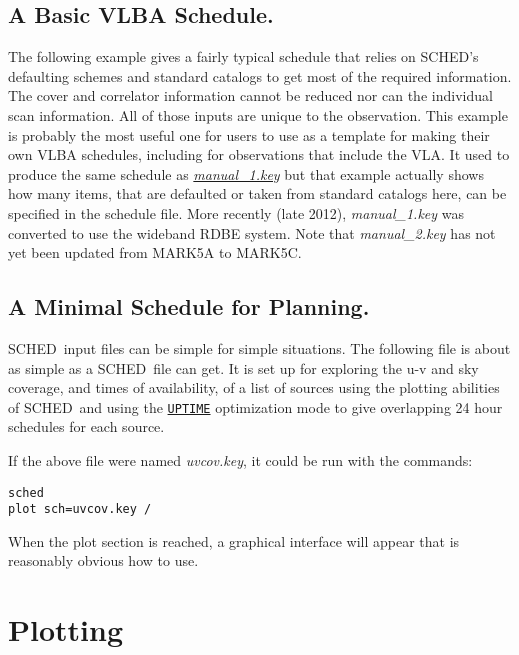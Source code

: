 \documentclass{report}
\newcommand{\sched}{{\sc SCHED}}
\newcommand{\schedb}{{\sc SCHED~}}
\begin{document}
\subsection{\label{SSEC:EXAMPLE1}A Basic VLBA Schedule.}

The following example gives a fairly typical schedule that relies on
\sched's defaulting schemes and standard catalogs to get most of the
required information.  The cover and correlator information cannot be
reduced nor can the individual scan information.  All of those inputs
are unique to the observation.  This example is probably the most
useful one for users to use as a template for making their own VLBA
schedules, including for observations that include the
VLA.  It used to produce the same schedule as 
{\href{examples/manual\_1.key}{{\sl manual\_1.key}}}
but that example actually
shows how many items, that are defaulted or taken from standard
catalogs here, can be specified in the schedule file.  More recently
(late 2012), {\sl manual\_1.key} was converted to use the wideband
RDBE system.  Note that {\sl manual\_2.key} has not yet been updated
from MARK5A to MARK5C.




\subsection{\label{SSEC:EXAMPLE3}A Minimal Schedule for Planning.}

\schedb input files can be simple for simple situations.  The
following file is about as simple as a \schedb file can get.  It is
set up for exploring the u-v and sky coverage, and times of
availability, of a list of sources using the plotting abilities of
\schedb and using the 
{\hyperref[MP:OPTMODE]{{\tt UPTIME}}} optimization
mode to give overlapping 24 hour schedules for each source.



If the above file were named {\sl uvcov.key}, it could be run with the
commands:
\begin{verbatim}
sched
plot sch=uvcov.key /
\end{verbatim}
When the plot section is reached, a graphical interface will appear
that is reasonably obvious how to use.



\section{\label{SEC:PLOT}Plotting}
\end{document}
